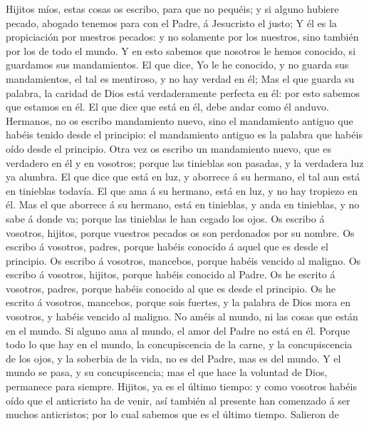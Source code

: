  Hijitos míos, estas cosas os escribo, para que no
pequéis; y si alguno hubiere pecado, abogado tenemos para con el Padre,
á Jesucristo el justo;  Y él es la propiciación por
nuestros pecados: y no solamente por los nuestros, sino también por los
de todo el mundo.  Y en esto sabemos que nosotros le hemos
conocido, si guardamos sus mandamientos.  El que dice, Yo
le he conocido, y no guarda sus mandamientos, el tal es mentiroso, y no
hay verdad en él;  Mas el que guarda su palabra, la
caridad de Dios está verdaderamente perfecta en él: por esto sabemos que
estamos en él.  El que dice que está en él, debe andar
como él anduvo.  Hermanos, no os escribo mandamiento
nuevo, sino el mandamiento antiguo que habéis tenido desde el principio:
el mandamiento antiguo es la palabra que habéis oído desde el principio.
 Otra vez os escribo un mandamiento nuevo, que es
verdadero en él y en vosotros; porque las tinieblas son pasadas, y la
verdadera luz ya alumbra.  El que dice que está en luz, y
aborrece á su hermano, el tal aun está en tinieblas todavía.
 El que ama á su hermano, está en luz, y no hay tropiezo
en él.  Mas el que aborrece á su hermano, está en
tinieblas, y anda en tinieblas, y no sabe á donde va; porque las
tinieblas le han cegado los ojos.  Os escribo á vosotros,
hijitos, porque vuestros pecados os son perdonados por su nombre.
 Os escribo á vosotros, padres, porque habéis conocido á
aquel que es desde el principio. Os escribo á vosotros, mancebos, porque
habéis vencido al maligno. Os escribo á vosotros, hijitos, porque habéis
conocido al Padre.  Os he escrito á vosotros, padres,
porque habéis conocido al que es desde el principio. Os he escrito á
vosotros, mancebos, porque sois fuertes, y la palabra de Dios mora en
vosotros, y habéis vencido al maligno.  No améis al
mundo, ni las cosas que están en el mundo. Si alguno ama al mundo, el
amor del Padre no está en él.  Porque todo lo que hay en
el mundo, la concupiscencia de la carne, y la concupiscencia de los
ojos, y la soberbia de la vida, no es del Padre, mas es del mundo.
 Y el mundo se pasa, y su concupiscencia; mas el que hace
la voluntad de Dios, permanece para siempre.  Hijitos, ya
es el último tiempo: y como vosotros habéis oído que el anticristo ha de
venir, así también al presente han comenzado á ser muchos anticristos;
por lo cual sabemos que es el último tiempo.  Salieron de
